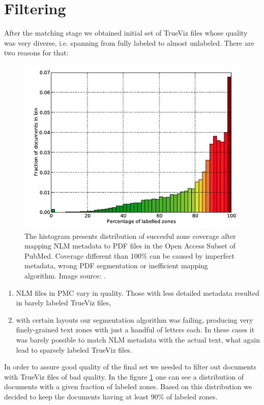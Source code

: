 \section{Filtering}
After the matching stage we obtained initial set of TrueViz files whose quality was very diverse, i.e. spanning from fully labeled to almost unlabeled. There are two reasons for that:
\begin{figure}[ht!]
  \centering
  \includegraphics[width=12cm]{plots/zone_coverage_grotoap2}
  \caption{The histogram presents distribution of succesful zone coverage after mapping NLM metadata to PDF files in the Open Access Subset of PubMed. Coverage different than 100\% can be caused by imperfect metadata, wrong PDF segmentation or inefficient mapping algorithm. Image source: \cite{DominikaTkaczykPaweSzostek2014}.}
  \label{fig:trueviz_match_histogram}
\end{figure}
\begin{enumerate}
\item NLM files in PMC vary in quality. Those with less detailed metadata resulted in barely labeled TrueViz files,
\item with certain layouts our segmentation algorithm was failing, producing very finely-grained text zones with just a handful of letters each. In these cases it was barely possible to match NLM metadata with the actual text, what again lead to sparsely labeled TrueViz files. 
\end{enumerate}
In order to assure good quality of the final set we needed to filter out documents with TrueViz files of bad quality. In the figure \ref{fig:trueviz_match_histogram} one can see a distribution of documents with a given fraction of labeled zones.
Based on this distribution we decided to keep the documents having at least 90\% of labeled zones.


